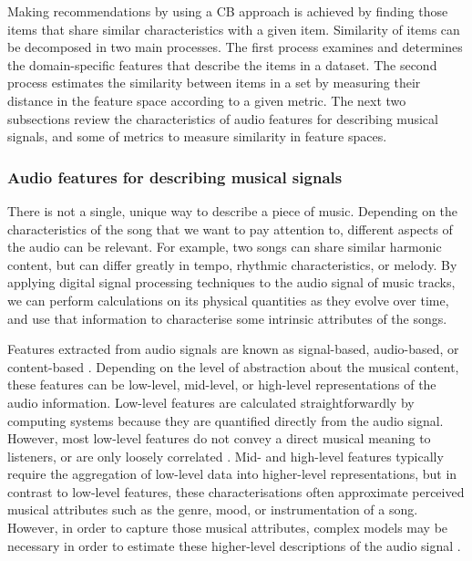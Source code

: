 Making recommendations by using a CB approach is achieved by finding those items that share similar characteristics with a given item.
Similarity of items can be decomposed in two main processes. The first process examines and determines the domain-specific features that describe the items in a dataset. The second process estimates the similarity between items in a set by measuring their distance in the feature space according to a given metric.
The next two subsections review the characteristics of audio features for describing musical signals, and some of metrics to measure similarity in  feature spaces.



\subsubsection{Audio features for describing musical signals}
There is not a single, unique way to describe a piece of music. Depending on the characteristics of the song that we want to pay attention to, different aspects of the audio can be relevant. For example, two songs can share similar harmonic content, but can differ greatly in tempo, rhythmic characteristics, or melody.
By applying digital signal processing techniques to the audio signal of music tracks, we can perform calculations on its physical quantities as they evolve over time, and use that information to characterise some intrinsic attributes of the songs.

Features extracted from audio signals are known as signal-based, audio-based, or con\-tent-based \autocite{schedl12useraware}. Depending on the level of abstraction about the musical content, these features can be low-level, mid-level, or high-level representations of the audio information. 
Low-level features are calculated straightforwardly by computing systems because they are quantified directly from the audio signal. However, most low-level features do not convey a direct musical meaning to listeners, or are only loosely correlated \autocite{gouyon08content}. Mid- and high-level features typically require the aggregation of low-level data into higher-level representations, but in contrast to low-level features, these characterisations often approximate perceived musical attributes such as the genre, mood, or instrumentation of a song. 
However, in order to capture those musical attributes, complex models may be necessary in order to estimate these higher-level descriptions of the audio signal \autocite{van13deep}.



